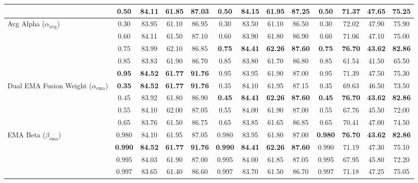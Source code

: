 ﻿\documentclass[letterpaper,journal]{IEEEtran}
\begin{document}
\begin{table}[!t]
{\begin{tabular}{@{}l c ccc c ccc c ccc@{}}
& 0.50 & 84.11 & 61.85 & 87.03 & 0.50 & 84.15 & 61.95 & 87.25 & 0.50 & 71.37 & 47.65 & 75.25 \\
\midrule
\multirow{5}{*}{Avg Alpha ($\alpha_{\text{avg}}$)}
& 0.30 & 83.95 & 61.10 & 86.95 & 0.30 & 83.50 & 61.10 & 86.50 & 0.30 & 72.02 & 47.90 & 75.90 \\
& 0.60 & 84.11 & 61.50 & 87.10 & 0.60 & 83.90 & 61.80 & 86.90 & 0.60 & 71.06 & 47.10 & 75.00 \\
& 0.75 & 83.99 & 62.10 & 86.85 & \textbf{0.75} & \textbf{84.41} & \textbf{62.26} & \textbf{87.60} & \textbf{0.75} & \textbf{76.70} & \textbf{43.62} & \textbf{82.86} \\
& 0.85 & 83.83 & 61.90 & 86.70 & 0.85 & 83.80 & 61.70 & 86.80 & 0.85 & 61.54 & 41.50 & 65.50 \\
& \textbf{0.95} & \textbf{84.52} & \textbf{61.77} & \textbf{91.76} & 0.95 & 83.95 & 61.90 & 87.00 & 0.95 & 71.39 & 47.50 & 75.30 \\
\midrule
\multirow{4}{*}{Dual EMA Fusion Weight ($\alpha_{\mathrm{ema}}$)}
& \textbf{0.35} & \textbf{84.52} & \textbf{61.77} & \textbf{91.76} & 0.35 & 84.10 & 61.95 & 87.15 & 0.35 & 69.63 & 46.50 & 73.50 \\
& 0.45 & 83.92 & 61.80 & 86.90 & \textbf{0.45} & \textbf{84.41} & \textbf{62.26} & \textbf{87.60} & \textbf{0.45} & \textbf{76.70} & \textbf{43.62} & \textbf{82.86} \\
& 0.55 & 84.10 & 62.00 & 87.05 & 0.55 & 84.00 & 61.90 & 87.00 & 0.55 & 67.76 & 45.50 & 72.00 \\
& 0.65 & 83.76 & 61.50 & 86.75 & 0.65 & 83.85 & 61.65 & 86.85 & 0.65 & 70.41 & 47.00 & 74.50 \\
\midrule
\multirow{5}{*}{EMA Beta ($\beta_{\text{ema}}$)}
& 0.980 & 84.10 & 61.95 & 87.05 & 0.980 & 83.95 & 61.80 & 87.00 & \textbf{0.980} & \textbf{76.70} & \textbf{43.62} & \textbf{82.86} \\
& \textbf{0.990} & \textbf{84.52} & \textbf{61.77} & \textbf{91.76} & \textbf{0.990} & \textbf{84.41} & \textbf{62.26} & \textbf{87.60} & 0.990 & 71.19 & 47.30 & 75.10 \\
& 0.995 & 84.03 & 61.90 & 87.00 & 0.995 & 84.00 & 61.85 & 87.05 & 0.995 & 67.95 & 45.80 & 72.20 \\
& 0.997 & 83.65 & 61.40 & 86.60 & 0.997 & 83.70 & 61.50 & 86.70 & 0.997 & 71.18 & 47.25 & 75.05 \\
\bottomrule
\end{tabular}}
\end{table}
\end{document}
